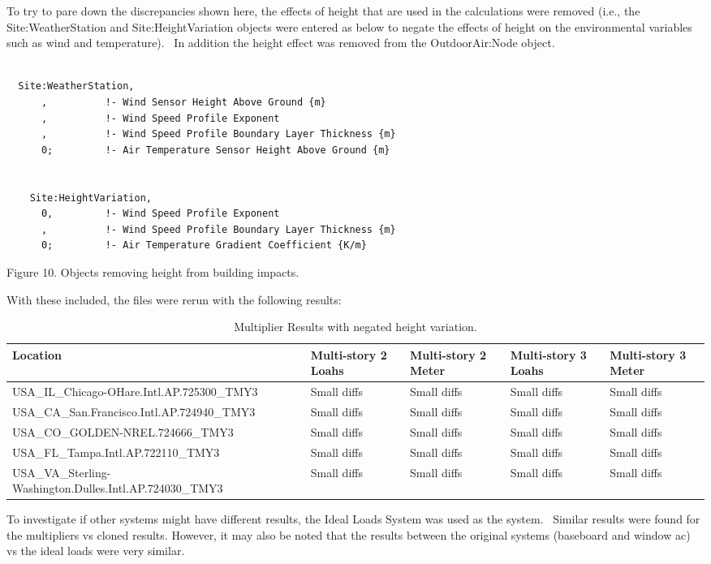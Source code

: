 To try to pare down the discrepancies shown here, the effects of height that are used in the calculations were removed (i.e., the Site:WeatherStation and Site:HeightVariation objects were entered as below to negate the effects of height on the environmental variables such as wind and temperature).~ In addition the height effect was removed from the OutdoorAir:Node object.

\begin{lstlisting}

  Site:WeatherStation,
      ,          !- Wind Sensor Height Above Ground {m}
      ,          !- Wind Speed Profile Exponent
      ,          !- Wind Speed Profile Boundary Layer Thickness {m}
      0;         !- Air Temperature Sensor Height Above Ground {m}


    Site:HeightVariation,
      0,         !- Wind Speed Profile Exponent
      ,          !- Wind Speed Profile Boundary Layer Thickness {m}
      0;         !- Air Temperature Gradient Coefficient {K/m}
\end{lstlisting}

Figure 10. Objects removing height from building impacts.

With these included, the files were rerun with the following results:

\begin{longtable}[c]{p{1.2in}p{1.2in}p{1.2in}p{1.2in}p{1.2in}}
\caption{Multiplier Results with negated height variation. \protect \label{table:multiplier-results-with-negated-height}}\\
\toprule 
Location & Multi-story 2 Loahs & Multi-story 2 Meter & Multi-story 3 Loahs & Multi-story 3 Meter \tabularnewline \midrule
\endhead
USA\_IL\_Chicago-OHare.Intl.AP.725300\_TMY3 & Small diffs & Small diffs & Small diffs & Small diffs \tabularnewline
USA\_CA\_San.Francisco.Intl.AP.724940\_TMY3 & Small diffs & Small diffs & Small diffs & Small diffs \tabularnewline
USA\_CO\_GOLDEN-NREL.724666\_TMY3 & Small diffs & Small diffs & Small diffs & Small diffs \tabularnewline
USA\_FL\_Tampa.Intl.AP.722110\_TMY3 & Small diffs & Small diffs & Small diffs & Small diffs \tabularnewline
USA\_VA\_Sterling-Washington.Dulles.Intl.AP.724030\_TMY3 & Small diffs & Small diffs & Small diffs & Small diffs \tabularnewline
\bottomrule
\end{longtable}

To investigate if other systems might have different results, the Ideal Loads System was used as the system.~ Similar results were found for the multipliers vs cloned results. However, it may also be noted that the results between the original systems (baseboard and window ac) vs the ideal loads were very similar.

